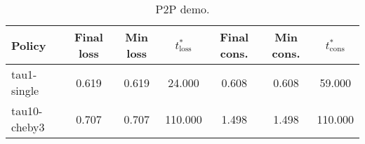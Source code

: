 \begin{table}[t]
\centering
\begin{tabular}{lcccccc}
\toprule
Policy & Final loss & Min loss & $t^*_{\text{loss}}$ & Final cons. & Min cons. & $t^*_{\text{cons}}$ \\
\midrule
tau1-single & 0.619 & 0.619 & 24.000 & 0.608 & 0.608 & 59.000 \\
tau10-cheby3 & 0.707 & 0.707 & 110.000 & 1.498 & 1.498 & 110.000 \\
\bottomrule
\end{tabular}
\caption{P2P demo.}
\label{tab:p2p_demo}
\end{table}